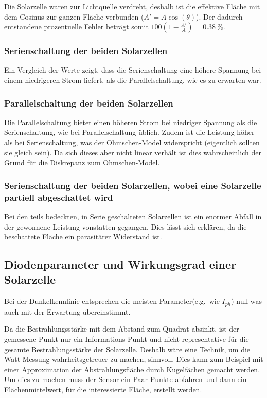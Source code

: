 \documentclass[12pt,english,ngerman]{scrartcl}
\begin{document}
Die Solarzelle waren zur Lichtquelle verdreht, deshalb ist die effektive Fläche
mit dem Cosinus zur ganzen Fläche verbunden ($A' = A \cos(\theta)$). Der
dadurch entstandene prozentuelle Fehler beträgt somit
$100(1-\frac{A'}{A})=\SI{0.38}{\percent}$.

\subsubsection{Serienschaltung der beiden Solarzellen}

Ein Vergleich der Werte zeigt, dass die Serienschaltung eine höhere Spannung
bei einem niedrigeren Strom liefert, als die Parallelschaltung, wie es zu
erwarten war.

\subsubsection{Parallelschaltung der beiden Solarzellen}

Die Parallelschaltung bietet einen höheren Strom bei niedriger Spannung als die
Serienschaltung, wie bei Parallelschaltung üblich. Zudem ist die Leistung höher
als bei Serienschaltung, was der Ohmschen-Model widerspricht (eigentlich
sollten sie gleich sein). Da sich dieses aber nicht linear verhält ist dies
wahrscheinlich der Grund für die Diskrepanz zum Ohmschen-Model.

\subsubsection{Serienschaltung der beiden Solarzellen, wobei eine Solarzelle partiell abgeschattet wird}

Bei den teils bedeckten, in Serie geschalteten Solarzellen ist ein enormer
Abfall in der gewonnene Leistung vonstatten gegangen. Dies lässt sich erklären,
da die beschattete Fläche ein parasitärer Widerstand ist.

\subsection{Diodenparameter und Wirkungsgrad einer Solarzelle}

Bei der Dunkelkennlinie entsprechen die meisten Parameter(e.g.\ wie $I_{ph}$)
null was auch mit der Erwartung übereinstimmt.

Da die Bestrahlungsstärke mit dem Abstand zum Quadrat absinkt, ist der
gemessene Punkt nur ein Informations Punkt und nicht representative für die
gesamte Bestrahlungsstärke der Solarzelle. Deshalb wäre eine Technik, um die
Watt Messung wahrheitsgetreuer zu machen, sinnvoll. Dies kann zum Beispiel mit
einer Approximation der Abstrahlungsfläche durch Kugelfächen gemacht werden. Um
dies zu machen muss der Sensor ein Paar Punkte abfahren und dann ein
Flächenmittelwert, für die interessierte Fläche, erstellt werden.
\end{document}
